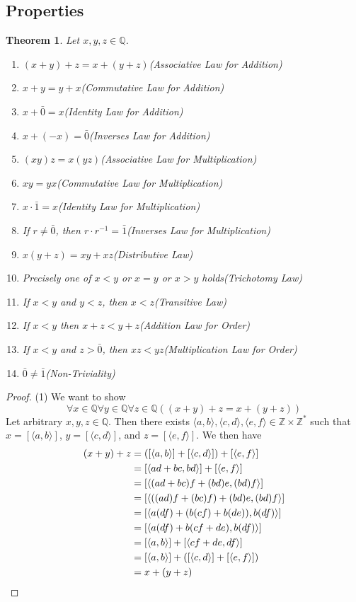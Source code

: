 \documentclass{report}
\newtheorem{theorem}[theo]{Theorem}
\begin{document}
\subsection{Properties}
\begin{theorem}\label{rational_arithmetic_1}
Let $x,y,z\in\mathbb Q$.
\begin{enumerate}
\item$(x+y)+z=x+(y+z)$\quad(Associative Law for Addition)
\item$x+y=y+x$\quad(Commutative Law for Addition)
\item$x+\bar0=x$\quad(Identity Law for Addition)
\item$x+(-x)=\bar0$\quad(Inverses Law for Addition)
\item$(xy)z=x(yz)$\quad(Associative Law for Multiplication)
\item$xy=yx$\quad(Commutative Law for Multiplication)
\item$x\cdot\bar1=x$\quad(Identity Law for Multiplication)
\item If $r\neq\bar0$, then $r\cdot r^{-1}=\bar1$\quad(Inverses Law for Multiplication)
\item$x(y+z)=xy+xz$\quad(Distributive Law)
\item Precisely one of $x<y$ or $x=y$ or $x>y$ holds\quad(Trichotomy Law)
\item If $x<y$ and $y<z$, then $x<z$\quad(Transitive Law)
\item If $x<y$ then $x+z<y+z$\quad(Addition Law for Order)
\item If $x<y$ and $z>\bar0$, then $xz<yz$\quad(Multiplication Law for Order)
\item $\bar0\neq\bar1$\quad(Non-Triviality)
\end{enumerate}
\end{theorem}
\begin{proof}(1)
We want to show
\begin{equation*}
\forall x\in\mathbb Q\forall y\in\mathbb Q\forall z\in\mathbb Q((x+y)+z=x+(y+z))
\end{equation*}
Let arbitrary $x,y,z\in\mathbb Q$. Then there exists $\langle a,b\rangle,\langle c,d\rangle,\langle e,f\rangle\in\mathbb Z\times\mathbb Z^*$ such that 
$x=[\langle a,b\rangle]$, $y=[\langle c,d\rangle]$, and $z=[\langle e,f\rangle]$. We then have
\begin{align*}
(x+y)+z&=([\langle a,b\rangle]+[\langle c,d\rangle])+[\langle e,f\rangle]\\
&=[\langle ad+bc,bd\rangle]+[\langle e,f\rangle]\\
&=[\langle(ad+bc)f+(bd)e,(bd)f\rangle]\\
&=[\langle((ad)f+(bc)f)+(bd)e,(bd)f\rangle]\\
&=[\langle a(df)+(b(cf)+b(de)),b(df)\rangle]\\
&=[\langle a(df)+b(cf+de),b(df)\rangle]\\
&=[\langle a,b\rangle]+[\langle cf+de,df\rangle]\\
&=[\langle a,b\rangle]+([\langle c,d\rangle]+[\langle e,f\rangle])\\
&=x+(y+z)\qedhere
\end{align*}
\end{proof}
\end{document}
